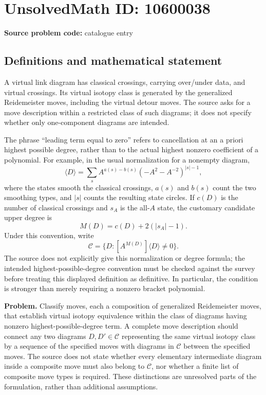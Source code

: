 \documentclass[11pt]{article}
\begin{document}
\section*{UnsolvedMath ID: 10600038}
\textbf{Source problem code:} catalogue entry
\subsection{Definitions and mathematical statement}
A virtual link diagram has classical crossings, carrying over/under data, and virtual crossings. Its virtual isotopy class is generated by the generalized Reidemeister moves, including the virtual detour moves. The source asks for a move description within a restricted class of such diagrams; it does not specify whether only one-component diagrams are intended.

The phrase ``leading term equal to zero'' refers to cancellation at an a priori highest possible degree, rather than to the actual highest nonzero coefficient of a polynomial. For example, in the usual normalization for a nonempty diagram,
\[
 \langle D\rangle=\sum_s A^{a(s)-b(s)}(-A^2-A^{-2})^{|s|-1},
\]
where the states smooth the classical crossings, $a(s)$ and $b(s)$ count the two smoothing types, and $|s|$ counts the resulting state circles. If $c(D)$ is the number of classical crossings and $s_A$ is the all-$A$ state, the customary candidate upper degree is
\[
 M(D)=c(D)+2(|s_A|-1).
\]
Under this convention, write
\[
 \mathcal C=\{D:[A^{M(D)}]\langle D\rangle\ne0\}.
\]
The source does not explicitly give this normalization or degree formula; the intended highest-possible-degree convention must be checked against the survey before treating this displayed definition as definitive. In particular, the condition is stronger than merely requiring a nonzero bracket polynomial.

\textbf{Problem.} Classify moves, each a composition of generalized Reidemeister moves, that establish virtual isotopy equivalence within the class of diagrams having nonzero highest-possible-degree term. A complete move description should connect any two diagrams $D,D'\in\mathcal C$ representing the same virtual isotopy class by a sequence of the specified moves with diagrams in $\mathcal C$ between the specified moves. The source does not state whether every elementary intermediate diagram inside a composite move must also belong to $\mathcal C$, nor whether a finite list of composite move types is required. These distinctions are unresolved parts of the formulation, rather than additional assumptions.
\end{document}
